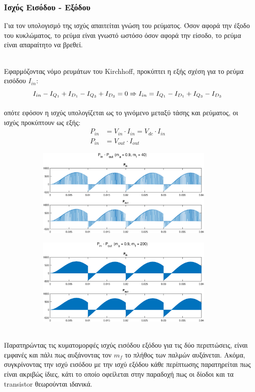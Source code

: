 \subsubsection*{Ισχύς Εισόδου - Εξόδου}
Για τον υπολογισμό της ισχύς απαιτείται γνώση του ρεύματος. Όσον αφορά την έξοδο του κυκλώματος, το ρεύμα είναι γνωστό ωστόσο όσον αφορά την είσοδο, το ρεύμα είναι απαραίτητο να βρεθεί. 

\noindent\\
Εφαρμόζοντας νόμο ρευμάτων του Kirchhoff, προκύπτει η εξής σχέση για το ρεύμα εισόδου $I_{in}$:
\begin{equation}
	I_{in} - I_{Q_1} + I_{D_1} - I_{Q_3} + I_{D_3} = 0 \xRightarrow{} I_{in} = I_{Q_1} - I_{D_1} + I_{Q_3} - I_{D_3} 	
\end{equation}

οπότε εφόσον η ισχύς υπολογίζεται ως το γινόμενο μεταξύ τάσης και ρεύματος, οι ισχύς προκύπτουν ως εξής:
\begin{align*}
	P_{in} &= V_{in} \cdot I_{in} = V_{dc} \cdot I_{in}\\
	P_{in} &= V_{out} \cdot I_{out}
\end{align*}
\begin{figure}[h!]
	\begin{subfigure}{0.49\textwidth}
		\centering
		\includegraphics[width=0.95\textwidth]{Images/P_40}
	\end{subfigure}
	\begin{subfigure}{0.49\textwidth}
		\centering
		\includegraphics[width=0.95\textwidth]{Images/P_200}
	\end{subfigure}
\end{figure}
\noindent\\
Παρατηρώντας τις κυματομορφές ισχύς εισόδου εξόδου για τις δύο περιπτώσεις, είναι εμφανές και πάλι πως αυξάνοντας τον $m_f$ το πλήθος των παλμών αυξάνεται. Ακόμα, συγκρίνοντας την ισχύ εισόδου με την ισχύ εξόδου κάθε περίπτωσης παρατηρείται πως είναι ακριβώς ίδιες, κάτι το οποίο οφείλεται στην παραδοχή πως οι δίοδοι και τα transistor θεωρούνται ιδανικά.

